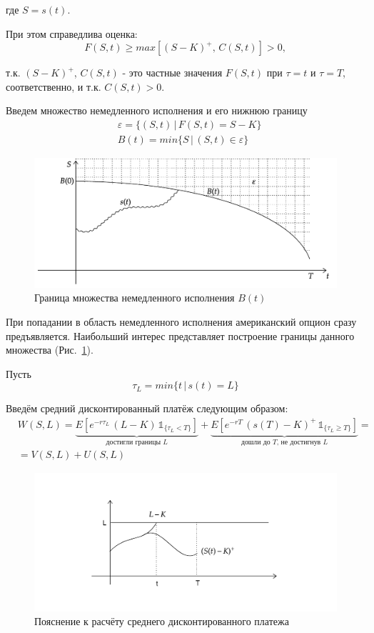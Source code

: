 \documentclass[oneside,final,12pt]{article}
\begin{document}
\noindent
где $S=s(t)$.

При этом справедлива оценка:
$$
F(S,t) \geq max[(S-K)^+, \, C(S,t)] > 0,
$$

\noindent
т.к. $(S-K)^+$, $C(S,t)$ - это частные значения $F(S,t)$ при $\tau=t$ и $\tau=T$, соответственно, и т.к. $C(S,t)>0$.

Введем множество немедленного исполнения и его нижнюю границу
\begin{align*}
    & \varepsilon = \{ (S,t) \, | \, F(S,t)=S-K \} \\
    & B(t) = min \{ S \, | \, (S,t) \in \varepsilon \}
\end{align*}

\begin{figure}[h!]
    \centering
    \includegraphics[scale=0.8]{Graph7.pdf}
    \caption{Граница множества немедленного исполнения $B(t)$}
    \label{boundary_of_set}
\end{figure}

При попадании в область немедленного исполнения американский опцион сразу предъявляется. Наибольший интерес представляет построение границы данного множества (Рис.~\ref{boundary_of_set}).

Пусть
$$
\tau_L = min \{ t \, | \, s(t)=L \}
$$

\noindent
Введём средний дисконтированный платёж следующим образом:
\begin{align*}
& W(S,L)= \underbrace{
        E[e^{-r\tau_L} \, (L-K) \, \mathbb{1}_{\{\tau_L < T\}}]
        }_{\text{достигли границы } L}
        + 
        \underbrace{
        E[e^{-rT} \, (s(T)-K)^+ \, \mathbb{1}_{\{\tau_L \geq T\}}]
        }_{\text{дошли до } T \text{, не достигнув } L} = \\
        & = V(S,L) + U(S,L)
\end{align*}

\begin{figure}[h]
    \centering
    \includegraphics[scale=0.35]{Graph1.png}
    \caption{Пояснение к расчёту среднего дисконтированного платежа}
    \label{demonstration}
\end{figure}
\end{document}
